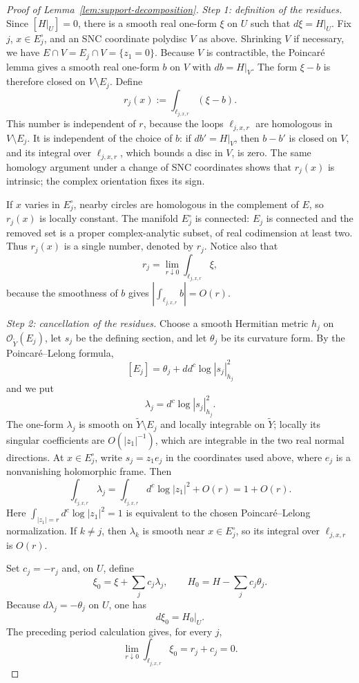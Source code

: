 \documentclass[reqno]{amsart}
\newcommand{\ddc}{dd^c}
\theoremstyle{plain}
\theoremstyle{remark}
\begin{document}
\begin{proof}[Proof of Lemma~\ref{lem:support-decomposition}]

\emph{Step 1: definition of the residues.}
Since $[H|_U]=0$, there is a smooth real one-form $\xi$ on $U$
such that $d\xi=H|_U$.  Fix $j$, $x\in E_j^\circ$, and an SNC
coordinate polydisc $V$ as above.  Shrinking $V$ if necessary, we
have $E\cap V=E_j\cap V=\{z_1=0\}$.  Because $V$ is contractible,
the Poincar\'e lemma gives a smooth real one-form $b$ on $V$ with
$db=H|_V$.  The form $\xi-b$ is therefore closed on
$V\setminus E_j$.  Define
\[
 r_j(x):=\int_{\ell_{j,x,r}}(\xi-b).
\]
This number is independent of $r$, because the loops
$\ell_{j,x,r}$ are homologous in $V\setminus E_j$.  It is
independent of the choice of $b$: if $db'=H|_V$, then $b-b'$ is
closed on $V$, and its integral over $\ell_{j,x,r}$, which bounds a
disc in $V$, is zero.  The same homology argument under a change of
SNC coordinates shows that $r_j(x)$ is intrinsic; the complex
orientation fixes its sign.

If $x$ varies in $E_j^\circ$, nearby circles are homologous in
the complement of $E$, so $r_j(x)$ is locally constant.
The manifold $E_j^\circ$ is connected: $E_j$ is connected and the
removed set is a proper complex-analytic subset, of real codimension at
least two.  Thus $r_j(x)$ is a single number, denoted by $r_j$.
Notice also that
\[
 r_j=\lim_{r\downarrow0}\int_{\ell_{j,x,r}}\xi ,
\]
because the smoothness of $b$ gives
$\left|\int_{\ell_{j,x,r}}b\right|=O(r)$.

\emph{Step 2: cancellation of the residues.}
Choose a smooth Hermitian metric $h_j$ on
$\mathcal O_{\widetilde Y}(E_j)$, let $s_j$ be the defining section,
and let $\theta_j$ be its curvature form. By the
Poincar\'e--Lelong formula,
\[
 [E_j]=\theta_j+\ddc\log|s_j|_{h_j}^2
\]
and we put
\[
 \lambda_j=d^c\log|s_j|_{h_j}^2.
\]
The one-form $\lambda_j$ is smooth on $\widetilde Y\setminus E_j$ and
locally integrable on $\widetilde Y$; locally its singular coefficients are
$O(|z_1|^{-1})$, which are integrable in the two real normal
directions.  At $x\in E_j^\circ$, write
$s_j=z_1e_j$ in the coordinates used above, where $e_j$ is a
nonvanishing holomorphic frame.  Then
\[
 \int_{\ell_{j,x,r}}\lambda_j
 =\int_{\ell_{j,x,r}}d^c\log|z_1|^2+O(r)
 =1+O(r).
\]
Here $\int_{|z_1|=r}d^c\log|z_1|^2=1$ is equivalent to the
chosen Poincar\'e--Lelong normalization.
If $k\ne j$, then $\lambda_k$ is smooth near
$x\in E_j^\circ$, so its integral over $\ell_{j,x,r}$ is $O(r)$.

Set $c_j=-r_j$ and, on $U$, define
\[
 \xi_0=\xi+\sum_jc_j\lambda_j,\qquad
 H_0=H-\sum_jc_j\theta_j.
\]
Because $d\lambda_j=-\theta_j$ on $U$, one has
\[
 d\xi_0=H_0|_U.
\]
The preceding period calculation gives, for every $j$,
\[
 \lim_{r\downarrow0}
 \int_{\ell_{j,x,r}}\xi_0=r_j+c_j=0.
\]


\end{proof}
\end{document}
